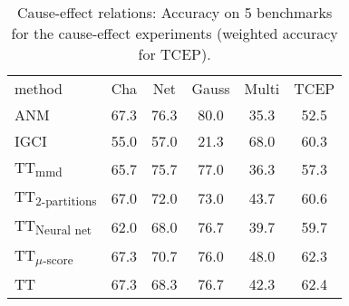 \vspace{0.03\textheight}
\begin{table}[H]
    \centering
    \begin{tabular}{lccccc}
        \hline method & Cha & Net & Gauss & Multi & TCEP \\
        ANM & 67.3 & 76.3 & 80.0 & 35.3 & 52.5\\
        IGCI & 55.0 & 57.0 & 21.3 & 68.0 & 60.3\\
        TT\textsubscript{mmd} & 65.7 & 75.7 & 77.0 & 36.3 & 57.3\\
        TT\textsubscript{2-partitions} & 67.0 & 72.0 & 73.0 & 43.7 & 60.6\\
        TT\textsubscript{Neural net} & 62.0 & 68.0 & 76.7 & 39.7 & 59.7\\
        TT\textsubscript{$\mu$-score}  & 67.3 & 70.7 & 76.0 & 48.0 & 62.3\\
        TT & 67.3 & 68.3 & 76.7 & 42.3 & 62.4\\
        \hline
    \end{tabular}

    \caption{Cause-effect relations: Accuracy
     on 5 benchmarks for the cause-effect experiments (weighted accuracy 
     for TCEP).}   
    \label{tab:own_perf}
\end{table}




